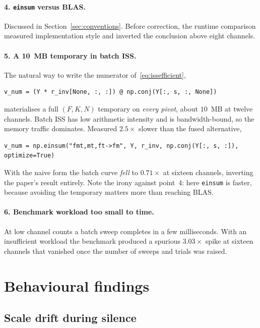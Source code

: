 \documentclass[11pt,a4paper]{article}
\begin{document}
\paragraph{4. \texttt{einsum} versus BLAS.} Discussed in
Section~\ref{sec:conventions}. Before correction, the runtime comparison
measured implementation style and inverted the conclusion above eight channels.

\paragraph{5. A 10~MB temporary in batch ISS.} The natural way to write the
numerator of~\eqref{eq:issefficient},
\begin{lstlisting}
v_num = (Y * r_inv[None, :, :]) @ np.conj(Y[:, s, :, None])
\end{lstlisting}
materialises a full $(F, K, N)$ temporary on \emph{every pivot}, about $10$~MB at
twelve channels. Batch ISS has low arithmetic intensity and is bandwidth-bound,
so the memory traffic dominates. Measured $2.5\times$ slower than the fused
alternative,
\begin{lstlisting}
v_num = np.einsum("fmt,mt,ft->fm", Y, r_inv, np.conj(Y[:, s, :]), optimize=True)
\end{lstlisting}
With the naive form the batch curve \emph{fell} to $0.71\times$ at sixteen
channels, inverting the paper's result entirely. Note the irony against
point~4: here \verb|einsum| is faster, because avoiding the temporary matters
more than reaching BLAS.

\paragraph{6. Benchmark workload too small to time.} At low channel counts a
batch sweep completes in a few milliseconds. With an insufficient workload the
benchmark produced a spurious $3.03\times$ spike at sixteen channels that
vanished once the number of sweeps and trials was raised.

\section{Behavioural findings}

\subsection{Scale drift during silence}
\end{document}
